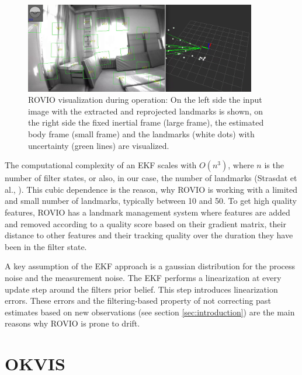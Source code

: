 \begin{figure}
   \centering
   \includegraphics[width=0.9\textwidth]{images/rovio_frontend.png}
   \caption{ROVIO visualization during operation: On the left side the input image with the extracted and reprojected landmarks is shown, on the right side the fixed inertial frame (large frame), the estimated body frame (small frame) and the landmarks (white dots) with uncertainty (green lines) are visualized.}
   \label{pics:rovio_frontend}
\end{figure}

The computational complexity of an EKF scales with $O(n^3)$, where $n$ is the number of filter states, or also, in our case, the number of landmarks (Strasdat et al., \cite{strasdat2010real}). This cubic dependence is the reason, why ROVIO is working with a limited and small number of landmarks, typically between 10 and 50. To get high quality features, ROVIO has a landmark management system where features are added and removed according to a quality score based on their gradient matrix, their distance to other features and their tracking quality over the duration they have been in the filter state. 

A key assumption of the EKF approach is a gaussian distribution for the process noise and the measurement noise. The EKF performs a linearization at every update step around the filters prior belief. This step introduces linearization errors. These errors and the filtering-based property of not correcting past estimates based on new observations (see section \ref{sec:introduction}) are the main reasons why ROVIO is prone to drift.



\section{OKVIS}
\label{sec:okvis}

